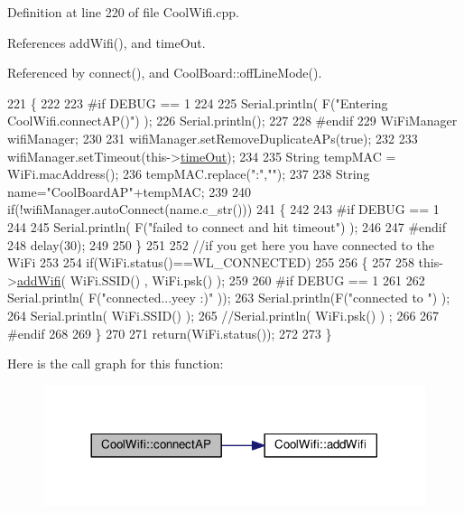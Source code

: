 Definition at line 220 of file Cool\+Wifi.\+cpp.



References add\+Wifi(), and time\+Out.



Referenced by connect(), and Cool\+Board\+::off\+Line\+Mode().


\begin{DoxyCode}
221 \{
222 
223 \textcolor{preprocessor}{#if DEBUG == 1 }
224     
225     Serial.println( F(\textcolor{stringliteral}{"Entering CoolWifi.connectAP()"}) );   
226     Serial.println();
227 
228 \textcolor{preprocessor}{#endif}
229     WiFiManager wifiManager;
230     
231     wifiManager.setRemoveDuplicateAPs(\textcolor{keyword}{true});
232 
233     wifiManager.setTimeout(this->\hyperlink{classCoolWifi_a952111605f25156588b5632caaba1c6f}{timeOut});
234     
235     String tempMAC = WiFi.macAddress();
236     tempMAC.replace(\textcolor{stringliteral}{":"},\textcolor{stringliteral}{""});
237 
238     String name=\textcolor{stringliteral}{"CoolBoardAP"}+tempMAC;  
239 
240     \textcolor{keywordflow}{if}(!wifiManager.autoConnect(name.c\_str())) 
241     \{
242     
243 \textcolor{preprocessor}{    #if DEBUG == 1}
244 
245         Serial.println( F(\textcolor{stringliteral}{"failed to connect and hit timeout"}) );
246     
247 \textcolor{preprocessor}{    #endif}
248         delay(30);
249 
250     \} 
251 
252     \textcolor{comment}{//if you get here you have connected to the WiFi}
253 
254     \textcolor{keywordflow}{if}(WiFi.status()==WL\_CONNECTED)
255 
256     \{
257 
258         this->\hyperlink{classCoolWifi_a914d7a1df14dd6b75345fb614c34e9d6}{addWifi}( WiFi.SSID() , WiFi.psk() );
259 
260 \textcolor{preprocessor}{    #if DEBUG == 1}
261     
262         Serial.println( F(\textcolor{stringliteral}{"connected...yeey :)"} ));
263         Serial.println(F(\textcolor{stringliteral}{"connected to "}) );
264         Serial.println( WiFi.SSID() );
265         \textcolor{comment}{//Serial.println( WiFi.psk() ) ;}
266 
267 \textcolor{preprocessor}{    #endif}
268     
269     \}
270     
271     \textcolor{keywordflow}{return}(WiFi.status());
272 
273 \}
\end{DoxyCode}
Here is the call graph for this function\+:
\nopagebreak
\begin{figure}[H]
\begin{center}
\leavevmode
\includegraphics[width=317pt]{classCoolWifi_a7c857f27161782f5ef1d62d552aff971_cgraph}
\end{center}
\end{figure}

